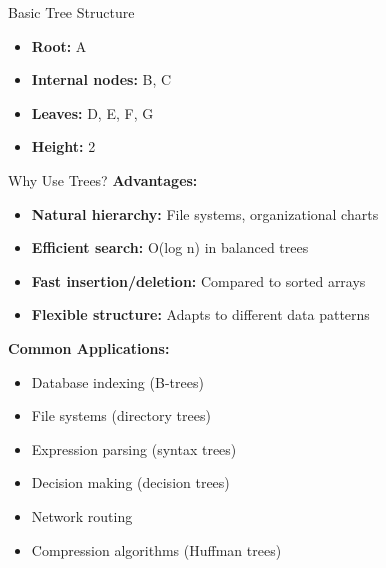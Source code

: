\documentclass[aspectratio=169]{beamer}
\begin{document}
\begin{frame}{Basic Tree Structure}
  \begin{center}
  \end{center}

  \vspace{0.3cm}
  \begin{itemize}
    \item \textbf{Root:} A
    \item \textbf{Internal nodes:} B, C
    \item \textbf{Leaves:} D, E, F, G
    \item \textbf{Height:} 2
  \end{itemize}
\end{frame}

\begin{frame}{Why Use Trees?}
  \textbf{Advantages:}
  \begin{itemize}
    \item \textbf{Natural hierarchy:} File systems, organizational charts
    \item \textbf{Efficient search:} O(log n) in balanced trees
    \item \textbf{Fast insertion/deletion:} Compared to sorted arrays
    \item \textbf{Flexible structure:} Adapts to different data patterns
  \end{itemize}

  \vspace{0.3cm}
  \textbf{Common Applications:}
  \begin{itemize}
    \item Database indexing (B-trees)
    \item File systems (directory trees)
    \item Expression parsing (syntax trees)
    \item Decision making (decision trees)
    \item Network routing
    \item Compression algorithms (Huffman trees)
  \end{itemize}
\end{frame}
\end{document}
